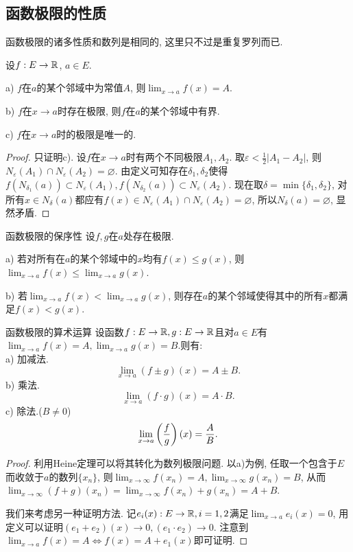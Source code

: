 \subsection{函数极限的性质}

函数极限的诸多性质和数列是相同的, 这里只不过是重复罗列而已. 

\begin{proposition}{}
	设$f:E \to \mathbb{R}$, $a \in E$.
	
	a) $f$在$a$的某个邻域中为常值$A$, 则$\lim_{x\to a}f(x) = A$.
	
	b) $f$在$x\to a$时存在极限, 则$f$在$a$的某个邻域中有界.
	
	c) $f$在$x\to a$时的极限是唯一的.
\end{proposition}
\begin{proof}
	只证明c). 设$f$在$x\to a$时有两个不同极限$A_1, A_2$. 取$\varepsilon < \frac{1}{2} |A_1-A_2|$, 则$N_{\varepsilon}(A_1) \cap N_{\varepsilon}(A_2) = \varnothing$. 由定义可知存在$\delta _1,\delta _2$使得$f(N_{\delta _1}(a)) \subset N_{\varepsilon}(A_1), f(N_{\delta _2}(a)) \subset N_{\varepsilon}(A_2)$. 现在取$\delta = \min \{ \delta _1,\delta _2 \}$, 对所有$x\in N_{\delta}(a)$都应有$f(x) \in N_{\varepsilon}(A_1) \cap N_{\varepsilon}(A_2) = \varnothing$, 所以$N_{\delta}(a)=\varnothing$, 显然矛盾. 
\end{proof}

\begin{proposition}{函数极限的保序性}
	设$f,g$在$a$处存在极限.
	
	a) 若对所有在$a$的某个邻域中的$x$均有$f(x) \leq g(x)$, 则$\lim_{x \to a} f(x) \leq \lim_{x \to a} g(x) $.
	
	b) 若$\lim_{x \to a} f(x) < \lim_{x \to a} g(x) $, 则存在$a$的某个邻域使得其中的所有$x$都满足$f(x) < g(x)$. 
\end{proposition}

\begin{theorem}{函数极限的算术运算}
	设函数$f:E \to \mathbb{R}, g:E\to \mathbb{R}$且对$a\in E$有$\lim_{x\to a} f(x) = A, \lim_{x\to a} g(x) = B$.则有:  \\
	a) 加减法. $$\lim_{x\to a} (f\pm g)(x) = A\pm B.$$
	b) 乘法. $$\lim_{x\to a} (f\cdot g)(x) = A \cdot B.$$
	c) 除法.($B\neq 0$) $$\lim_{x\to a} \left( \frac{f}{g} \right)(x) = \frac{A}{B}.$$
\end{theorem}
\begin{proof}
	利用Heine定理可以将其转化为数列极限问题. 以a)为例, 任取一个包含于$E$而收敛于$a$的数列$\{ x_n \}$, 则$\lim_{x\to \infty} f(x_n) = A,\lim_{x\to \infty} g(x_n) = B$, 从而$\lim_{x\to \infty} (f+g)(x_n) = \lim_{x\to \infty} f(x_n)+g(x_n) = A+B$. 
	
	我们来考虑另一种证明方法. 记$e_i(x):E \to \mathbb{R} ,i=1,2$满足$\lim_{x\to a} e_i(x)=0$, 用定义可以证明$(e_1+e_2)(x) \to 0 ,(e_1 \cdot e_2) \to 0$. 注意到$\lim_{x\to a} f(x) = A \Leftrightarrow f(x) = A+e_1(x)$即可证明. 
\end{proof}

